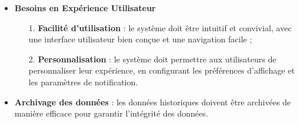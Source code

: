 \begin{itemize}
        \item\textbf{Besoins en Expérience Utilisateur}
    
                \begin{enumerate}
                    \item[1.] \textbf{Facilité d'utilisation} : le système doit être intuitif et convivial, avec une interface utilisateur bien conçue et une navigation facile ;
                    
                    \item[2.] \textbf{Personnalisation} : le système doit permettre aux utilisateurs de personnaliser leur expérience, en configurant les préférences d'affichage et les paramètres de notification.
                \end{enumerate}
        \item \textbf{Archivage des données } : les données historiques doivent être archivées de manière efficace pour garantir l'intégrité des données.
  \end{itemize}
